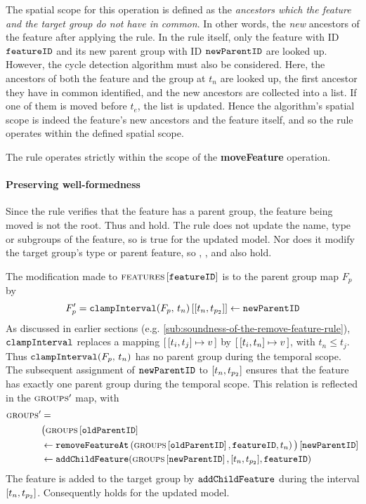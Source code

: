    The spatial scope for this operation is defined as the \emph{ancestors which the feature and the target group do not have in common}. In other words, the \emph{new} ancestors of the feature after applying the rule. In the rule itself, only the feature with ID $\texttt{featureID}$ and its new parent group with ID $\texttt{newParentID}$ are looked up. However, the cycle detection algorithm must also be considered. Here, the ancestors of both the feature and the group at $t_n$ are looked up, the first ancestor they have in common identified, and the new ancestors are collected into a list. If one of them is moved before $t_e$, the list is updated. Hence the algorithm's spatial scope is indeed the feature's new ancestors and the feature itself, and so the rule operates within the defined spatial scope.
\\

\begin{lemma}
   The  rule operates strictly within the scope of the \textbf{moveFeature} operation.
   \label{lemma:move-feature-scope}
\end{lemma}

\paragraph{Preserving well-formedness}
Since the rule verifies that the feature has a parent group, the feature being moved is not the root. Thus  and  hold. The rule does not update the name, type or subgroups of the feature, so  is true for the updated model. Nor does it modify the target group's type or parent feature, so , , and  also hold.

The modification made to $\textsc{features} \left[ \texttt{featureID} \right]$ is to the parent group map $F_p$ by 
\[
   F_p' = \lookup{\var{clampInterval}(F_p, \, t_n)}{\interval{t_n}{t_{p_2}}} \assign \var{newParentID}
\]
As discussed in earlier sections (e.g. \vref{sub:soundness-of-the-remove-feature-rule}), $\texttt{clampInterval}$ replaces a mapping $\intervalmapping{t_i}{t_j}{v}$ by $\intervalmapping{t_i}{t_n}{v}$, with $t_n \leq t_j$. Thus $\texttt{clampInterval}(F_p, \, t_n)$ has no parent group during the temporal scope. The subsequent assignment of $\texttt{newParentID}$ to $\interval{t_n}{t_{p_2}}$ ensures that the feature has exactly one parent group during the temporal scope. This relation is reflected in the $\textsc{groups}{}{}'$ map, with
\begin{align*}
   \groups' &= \\
            & \lookup{\big(\lookup{\groups{}}{\var{oldParentID}} \\
            & \assign \var{removeFeatureAt}\left(\lookup{\groups{}}{\var{oldParentID}}, \var{featureID}, t_n\right)\big)}{\var{newParentID}} \\
            & \assign \var{addChildFeature}(\lookup{\groups{}}{\var{newParentID}}, \interval{t_n}{t_{p_2}}, \var{featureID})
\end{align*}
The feature is added to the target group by $\texttt{addChildFeature}$ during the interval $\interval{t_n}{t_{p_2}}$. Consequently  holds for the updated model. 
\\

